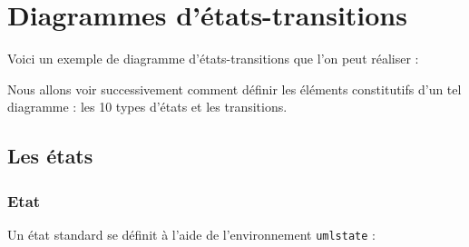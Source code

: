 \documentclass[a4paper,11pt]{report}
\newcommand{\inputTikZ}[1]{%
  }%
\newcommand{\inputTikZ}[1]{%
    \texttt{[image: fig/\#1.pdf]}%
  }%
\begin{document}
\vspace{-0.4cm}
{\color{red!70!black}

}

\begin{center}
\inputTikZ{figure50}
\end{center}


\chapter{Diagrammes d'états-transitions}\label{c.statetrans}

Voici un exemple de diagramme d'états-transitions que l'on peut réaliser :

\begin{center}
\inputTikZ{statediagex}
\end{center}

Nous allons voir successivement comment définir les éléments constitutifs d'un tel diagramme : les 10 types d'états et les transitions.

\newpage

\section{Les états}\label{s.state}

\subsection{Etat}\label{ss.state}

Un état \og standard\fg{} se définit à l'aide de l'environnement {\tt umlstate} :

\medskip

\begin{minipage}{0.51\textwidth}

\end{minipage}
\begin{minipage}{0.49\textwidth}
\begin{center}
\inputTikZ{figure51}
\end{center}
\end{minipage}

\medskip
\end{document}
